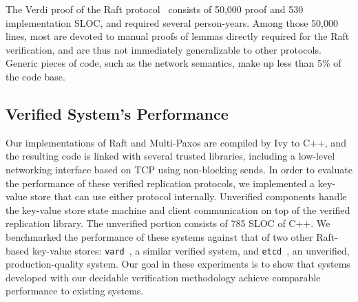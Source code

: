 
The Verdi proof of the Raft protocol~\cite{VerdiCPP} consists of
50,000 proof and 530 implementation SLOC, and required
several person-years. Among those 50,000 lines, most are devoted
to manual proofs of lemmas directly required for the Raft verification,
and are thus not immediately generalizable to other protocols.
Generic pieces of code, such as the network semantics, make up
less than 5\% of the code base.

\subsection{Verified System's Performance}
\label{sec:performance}

Our implementations of Raft and Multi-Paxos are compiled by Ivy to C++,
and the resulting code is linked with several trusted libraries,
including a low-level networking interface based on TCP using non-blocking sends.
%
In order to evaluate the performance of these verified replication protocols,
we implemented a key-value store
that can use either protocol internally.
Unverified components handle the key-value store state machine
and client communication on top of the verified replication library.
The unverified portion consists of 785 SLOC of C++.
We benchmarked the performance of these systems
against that of two other Raft-based key-value stores:
\texttt{vard}~\cite{Verdi}, a similar verified system,
and \texttt{etcd}~\cite{etcd},
an unverified, production-quality system.
Our goal in these experiments is to show that
systems developed with our decidable verification methodology
achieve comparable performance to existing systems.

